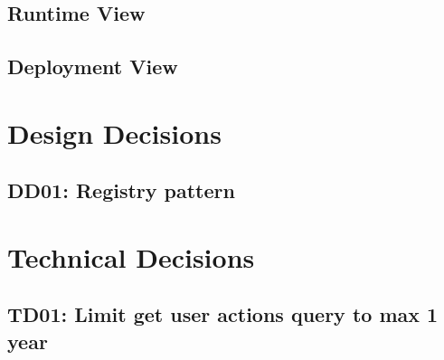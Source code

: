 \subsection{Runtime View}

\subsection{Deployment View}

\section{Design Decisions}

\subsection{DD01: Registry pattern}

\section{Technical Decisions}

\subsection{TD01: Limit get user actions query to max 1 year}
